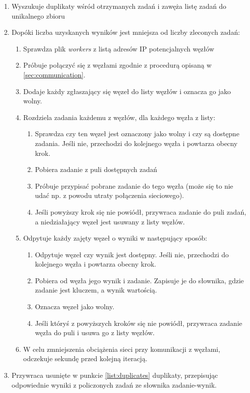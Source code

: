 \begin{enumerate}
  \item Wyszukuje duplikaty wśród otrzymanych zadań i zawęża listę zadań do unikalnego zbioru\label{list:duplicates}
  \item Dopóki liczba uzyskanych wyników jest mniejsza od liczby zleconych zadań:
    \begin{enumerate}
      \item Sprawdza plik \textit{workers} z listą adresów IP potencjalnych węzłów
      \item Próbuje połączyć się z węzłami zgodnie z procedurą opisaną w \ref{sec:communication}.
      \item Dodaje każdy zgłaszający się węzeł do listy węzłów i oznacza go jako wolny.
      \item Rozdziela zadania każdemu z węzłów, dla każdego węzła z listy:
        \begin{enumerate}
          \item Sprawdza czy ten węzeł jest oznaczony jako wolny i czy są dostępne zadania.
                Jeśli nie, przechodzi do kolejnego węzła i powtarza obecny krok.
          \item Pobiera zadanie z puli dostępnych zadań
          \item Próbuje przypisać pobrane zadanie do tego węzła (może się to nie udać np. z powodu utraty połączenia sieciowego).
          \item Jeśli powyższy krok się nie powiódł, przywraca zadanie do puli zadań, a niedziałający węzeł jest usuwany z listy węzłów.
        \end{enumerate}
      \item Odpytuje każdy zajęty węzeł o wyniki w następujący sposób:\label{enum:second_worker_check}
      \begin{enumerate}
        \item Odpytuje węzeł czy wynik jest dostępny.
              Jeśli nie, przechodzi do kolejnego węzła i powtarza obecny krok.
        \item Pobiera od węzła jego wynik i zadanie. Zapisuje je do słownika, gdzie zadanie jest kluczem, a wynik wartością.
        \item Oznacza węzeł jako wolny.
        \item Jeśli któryś z powyższych kroków się nie powiódł, przywraca zadanie węzła do puli i usuwa go z listy węzłów.
      \end{enumerate}
      \item W celu zmniejszenia obciążenia sieci przy komunikacji z węzłami, odczekuje sekundę przed kolejną iteracją.
    \end{enumerate}
  \item Przywraca usunięte w punkcie \ref{list:duplicates} duplikaty, przepisując odpowiednie wyniki z policzonych zadań ze słownika zadanie-wynik.
\end{enumerate}

